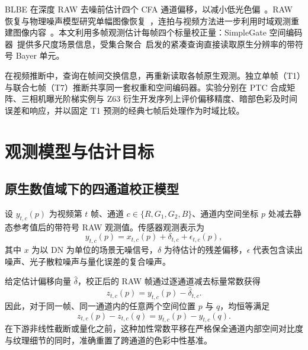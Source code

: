 BLBE 在深度 RAW 去噪前估计四个 CFA 通道偏移，以减小低光色偏~\cite{blbe}。RAW 恢复与物理噪声模型研究单幅图像恢复~\cite{sid,sidd,eld,noiseflow,unprocessing}，连拍与视频方法进一步利用时域观测重建图像内容~\cite{smd,fastdvd,crvd}。本文利用多帧观测估计每帧四个标量校正量：SimpleGate 空间编码器~\cite{naf}提供多尺度场景信息，受集合聚合~\cite{set,perceiver}启发的紧凑查询直接读取原生分辨率的带符号 Bayer 单元。

在视频推断中，查询在帧间交换信息，再重新读取各帧原生观测。独立单帧（T1）与联合七帧（T7）推断共享同一套权重和空间编码器。实验分别在 PTC 合成矩阵、三相机曝光阶梯实例与 Z63 衍生开发序列上评价偏移精度、暗部色彩及时间误差和响应，并以固定 T1 预测的经典七帧后处理作为时域比较。


\section{观测模型与估计目标}
\subsection{原生数值域下的四通道校正模型}
设 $y_{t,c}(p)$ 为视频第 $t$ 帧、通道 $c\in\{R,G_1,G_2,B\}$、通道内空间坐标 $p$ 处减去静态参考值后的带符号 RAW 观测值。传感器观测表示为
\begin{equation}
 y_{t,c}(p)=x_{t,c}(p)+\delta_{t,c}+\epsilon_{t,c}(p),
 \label{eq:observation}
\end{equation}
其中 $x$ 为以 DN 为单位的场景无噪信号，$\delta$ 为待估计的残差偏移，$\epsilon$ 代表包含读出噪声、光子散粒噪声与量化误差的复合噪声。

给定估计偏移向量 $\hat\delta$，校正后的 RAW 帧通过逐通道减去标量常数获得
\begin{equation}
 z_{t,c}(p)=y_{t,c}(p)-\hat\delta_{t,c}.
 \label{eq:correction}
\end{equation}
因此，对于同一帧、同一通道内的任意两个空间位置 $p$ 与 $q$，均恒等满足
\begin{equation}
 z_{t,c}(p)-z_{t,c}(q)=y_{t,c}(p)-y_{t,c}(q).
 \label{eq:invariance}
\end{equation}
在下游非线性截断或量化之前，这种加性常数平移在严格保全通道内部空间对比度与纹理细节的同时，准确重置了跨通道的色彩中性基准。


